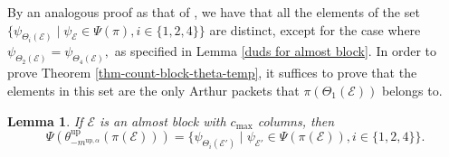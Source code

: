 \documentclass[11pt,letterpaper]{amsart}
\newcommand{\up}{{\mathrm{up}}}
\newcommand{\EE}{\mathcal{E}}
\newtheorem{lemma}[thm]{Lemma}
\numberwithin{equation}{section}
\begin{document}
By an analogous proof as that of \cite[Lemma 6.7]{HKT26}, we have that all the elements of the set $\{\psi_{\Theta_i(\EE)} \mid  \psi_\EE \in \Psi(\pi), i \in \{1, 2, 4\}\}$ are distinct, except for the case where $\psi_{\Theta_2(\mathcal{E})} = \psi_{\Theta_4(\mathcal{E})},$ as specified in Lemma \ref{duds for almost block}. In order to prove Theorem \ref{thm-count-block-theta-temp}, it suffices to prove that the elements in this set are the only Arthur packets that $\pi(\Theta_1(\mathcal{E}))$ belongs to.

\begin{lemma}
\label{Almost block classification}
    If $\mathcal{E}$ is an almost block with $c_{\max}$ columns, then
    $$\Psi(\theta_{-m^{\up, \alpha}}^\up(\pi(\mathcal{E}))) = \{\psi_{\Theta_i(\EE')} \mid  \psi_{\EE'} \in \Psi(\pi(\mathcal{E})), i \in \{1, 2, 4\}\}.$$
\end{lemma}
\end{document}
